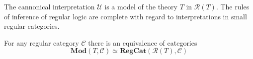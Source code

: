 \documentclass[14pt]{beamer}
\theoremstyle{plain}
\begin{document}
  \begin{frame}
    \begin{theorem}
      The cannonical interpretation $\mathcal{U}$ is a model of the theory $T$
      in $\mathcal{R}(T)$. \pause
      The rules of inference of
      regular logic are complete with regard to interpretations in small regular
      categories.
    \end{theorem}
    
    \begin{theorem}
      For any regular category $\mathcal{C}$ there is an equivalence of categories
      \[ \mathbf{Mod}(T, \mathcal{C}) \simeq \mathbf{RegCat}(\mathcal{R}(T), \mathcal{C}) \]
    \end{theorem}
  \end{frame}
\end{document}
